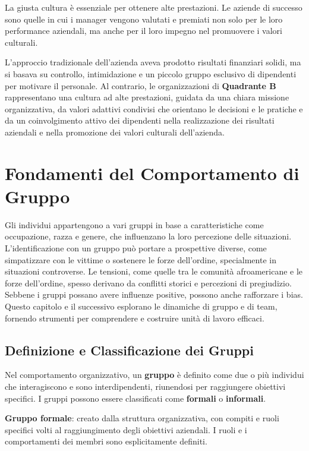 \documentclass{article}
\begin{document}
La giusta cultura è essenziale per ottenere alte prestazioni. Le aziende di successo sono quelle in cui i manager vengono valutati e premiati non solo per le loro performance aziendali, ma anche per il loro impegno nel promuovere i valori culturali.

L’approccio tradizionale dell’azienda aveva prodotto risultati finanziari solidi, ma si basava su controllo, intimidazione e un piccolo gruppo esclusivo di dipendenti per motivare il personale. Al contrario, le organizzazioni di \textbf{Quadrante B} rappresentano una cultura ad alte prestazioni, guidata da una chiara missione organizzativa, da valori adattivi condivisi che orientano le decisioni e le pratiche e da un coinvolgimento attivo dei dipendenti nella realizzazione dei risultati aziendali e nella promozione dei valori culturali dell’azienda.


\section{Fondamenti del Comportamento di Gruppo}

Gli individui appartengono a vari gruppi in base a caratteristiche come occupazione, razza e genere, che influenzano la loro percezione delle situazioni. L'identificazione con un gruppo può portare a prospettive diverse, come simpatizzare con le vittime o sostenere le forze dell'ordine, specialmente in situazioni controverse. Le tensioni, come quelle tra le comunità afroamericane e le forze dell'ordine, spesso derivano da conflitti storici e percezioni di pregiudizio. Sebbene i gruppi possano avere influenze positive, possono anche rafforzare i bias. Questo capitolo e il successivo esplorano le dinamiche di gruppo e di team, fornendo strumenti per comprendere e costruire unità di lavoro efficaci.

\subsection{Definizione e Classificazione dei Gruppi}

Nel comportamento organizzativo, un \textbf{gruppo} è definito come due o più individui che interagiscono e sono interdipendenti, riunendosi per raggiungere obiettivi specifici. I gruppi possono essere classificati come \textbf{formali} o \textbf{informali}.

\textbf{Gruppo formale}: creato dalla struttura organizzativa, con compiti e ruoli specifici volti al raggiungimento degli obiettivi aziendali. I ruoli e i comportamenti dei membri sono esplicitamente definiti.
\end{document}
